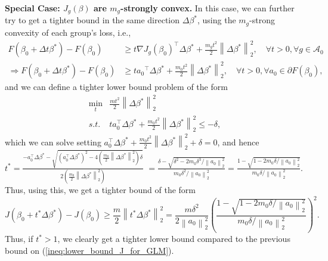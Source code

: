 \documentclass[11pt]{article}
\theoremstyle{plain}
\theoremstyle{definition}
\newcommand{\norm}[1]{\left\lVert #1 \right\rVert}
\newcommand{\1}{\mathbf{1}}
\newcommand{\A}{\mathcal{A}}
\renewcommand{\t}{^{\top}}
\begin{document}
\begin{tcolorbox}[
    colback=lightgray, %
    width=\linewidth, %
    sharp corners=all %
]
\textbf{Special Case: $J_g(\beta)$ are $m_g$-strongly convex.} In this case, we can further try to get a tighter bound in the same direction $\Delta \beta^*$, using the $m_g$-strong convexity of each group's loss, i.e., \begin{align*}
  F(\beta_0+\Delta t\beta^*)-F(\beta_0) &\geq t{\nabla J_g(\beta_0)}\t\Delta \beta^* + \frac{m_gt^2}{2} \norm{\Delta \beta^*}_2^2 ,\quad \forall t > 0, \forall g\in \A_0\\
\Rightarrow  F(\beta_0+\Delta t\beta^*)-F(\beta_0) &\geq t{a_0}\t\Delta \beta^* + \frac{m_0t^2}{2} \norm{\Delta \beta^*}_2^2 ,\quad \forall t > 0, \forall a_0\in \partial F(\beta_0),
\end{align*}
and we can define a tighter lower bound problem of the form
\begin{equation}
    \begin{array}{cc}
      \displaystyle  \min_{t} & \frac{mt^2}{2}\norm{\Delta \beta^*}^2_{2} \\
        s.t. & t a_0\t\Delta \beta^* +  \frac{m_0t^2}{2} \norm{\Delta \beta^*}_2^2 \leq -\delta, %
    \end{array}
\end{equation}
which we can solve setting $a_0\t\Delta \beta^* +  \frac{m_0t^2}{2} \norm{\Delta \beta^*}_2^2 +\delta = 0$, and hence $t^*=\frac{-a_0\t\Delta \beta^* - \sqrt{(a_0\t\Delta \beta^*)^2- 4(\frac{m_0}{2} \norm{\Delta \beta^*}_2^2)\delta}}{2(\frac{m_0}{2} \norm{\Delta \beta^*}_2^2)}$ $=\frac{\delta - \sqrt{\delta^2 - {2m_0 \delta^3}/{ \norm{a_0}_2^2} }}{m_0\delta^2/{ \norm{a_0}_2^2}} = \frac{1 - \sqrt{1 - {2m_0 \delta}/{ \norm{a_0}_2^2} }}{m_0\delta/{ \norm{a_0}_2^2}}$. Thus, using this, we get a tighter bound of the form
\begin{equation}
\boxed{J(\beta_0 + t^*\Delta \beta^*)-J(\beta_0) \geq \frac{m}{2}\norm{t^*\Delta \beta^*}^2_{2} = \frac{m\delta^2}{2 \norm{a_0}^2_{2}} \left(\frac{1 - \sqrt{1 - {2m_0 \delta}/{ \norm{a_0}_2^2} }}{m_0\delta/{ \norm{a_0}_2^2}}\right)^2.}
\end{equation}
Thus, if $t^* > 1$, we clearly get a tighter lower bound compared to the previous bound on (\ref{ineq:lower_bound_J_for_GLM}).
\end{tcolorbox}
\end{document}
